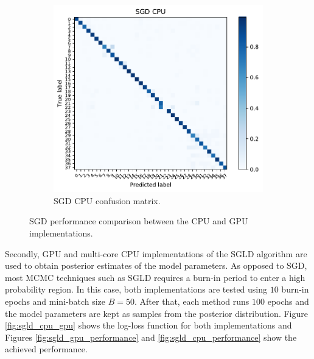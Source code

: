 \documentclass[conference]{IEEEtran}
\begin{document}
\begin{figure}
\begin{subfigure}[b]{0.2\textwidth}
		\includegraphics[width=\textwidth]{results/plants_confusion_matrix_sgd_cpu}
		\caption{SGD CPU confusion matrix.}
		\label{fig:sgd_cpu_performance}
	\end{subfigure}
	\caption{SGD performance comparison between the CPU and GPU implementations.}
\end{figure}

Secondly, GPU and multi-core CPU implementations of the SGLD algorithm are used to obtain posterior estimates of the model parameters. As opposed to SGD, most MCMC techniques such as SGLD requires a burn-in period to enter a high probability region. In this case, both implementations are tested using $10$ burn-in epochs and mini-batch size $B=50$. After that, each method runs $100$ epochs and the model parameters are kept as samples from the posterior distribution. Figure \ref{fig:sgld_cpu_gpu} shows the log-loss function for both implementations and Figures \ref{fig:sgld_gpu_performance} and \ref{fig:sgld_cpu_performance} show the achieved performance.
\end{document}
